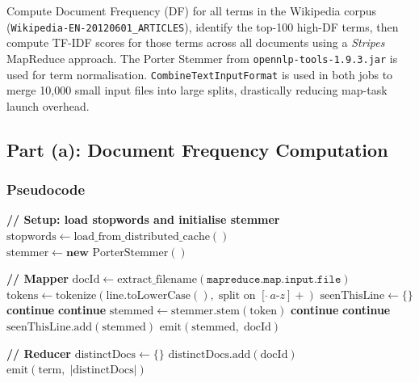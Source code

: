 \documentclass[12pt,a4paper]{article}
\begin{document}
\begin{objectivebox}
Compute Document Frequency (DF) for all terms in the Wikipedia corpus
(\texttt{Wikipedia-EN-20120601\_ARTICLES}), identify the top-100 high-DF terms,
then compute TF-IDF scores for those terms across all documents using a
\emph{Stripes} MapReduce approach.
The Porter Stemmer from \texttt{opennlp-tools-1.9.3.jar} is used for term
normalisation. \texttt{CombineTextInputFormat} is used in both jobs to merge
10,000 small input files into large splits, drastically reducing map-task
launch overhead.
\end{objectivebox}

\subsection{Part (a): Document Frequency Computation}

\subsubsection{Pseudocode}

\begin{algorithm}[H]
\caption{Document Frequency -- Map and Reduce}
\begin{algorithmic}[1]
\State \textbf{// Setup: load stopwords and initialise stemmer}
    \State $\text{stopwords} \leftarrow \text{load\_from\_distributed\_cache}()$
    \State $\text{stemmer} \leftarrow \textbf{new } \text{PorterStemmer}()$
\EndFunction

\State
\State \textbf{// Mapper}
    \State $\text{docId} \leftarrow \text{extract\_filename}(\texttt{mapreduce.map.input.file})$
    \State $\text{tokens} \leftarrow \text{tokenize}(\text{line.toLowerCase}(), \; \text{split on } [\hat{\;}a\text{-}z]+)$
    \State $\text{seenThisLine} \leftarrow \{\}$
         \textbf{continue} \EndIf
         \textbf{continue} \EndIf
        \State $\text{stemmed} \leftarrow \text{stemmer.stem}(\text{token})$
         \textbf{continue} \EndIf
         \textbf{continue} \EndIf
            \State $\text{seenThisLine.add}(\text{stemmed})$
            \State $\text{emit}(\text{stemmed},\; \text{docId})$
        \EndIf
    \EndFor
\EndFunction

\State
\State \textbf{// Reducer}
    \State $\text{distinctDocs} \leftarrow \{\}$
        \State $\text{distinctDocs.add}(\text{docId})$
    \EndFor
    \State $\text{emit}(\text{term},\; |\text{distinctDocs}|)$
\EndFunction
\end{algorithmic}
\end{algorithm}
\end{document}

